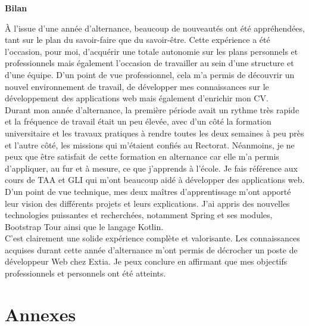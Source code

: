 \documentclass[12pt]{article}
\begin{document}
\begin{center}
\bfseries {Bilan}
\end{center}

À l'issue d'une année d'alternance, beaucoup de nouveautés ont été appréhendées, tant sur le plan du savoir-faire que du savoir-être. Cette expérience a été l'occasion, pour moi, d'acquérir une totale autonomie sur les plans personnels et professionnels mais également l'occasion de travailler au sein d'une structure et d'une équipe. D'un point de vue professionnel, cela m'a permis de découvrir un nouvel environnement de travail, de développer mes connaissances sur le développement des applications web mais également d'enrichir mon CV. \\


Durant mon année d'alternance, la première période avait un rythme très rapide et la fréquence de travail était un peu élevée, avec d'un côté la formation universitaire et les travaux pratiques à rendre toutes les deux semaines à peu près et l'autre côté, les missions qui m'étaient confiés au Rectorat. Néanmoins, je ne peux que être satisfait de cette formation en alternance car elle m'a permis d'appliquer, au fur et à mesure, ce que j’apprends à l'école. Je fais référence aux cours de TAA et GLI qui m'ont beaucoup aidé à développer des applications web. \\

D'un point de vue technique, mes deux maîtres d’apprentissage m'ont apporté leur vision des différents projets et leurs explications. J'ai appris des nouvelles technologies puissantes et recherchées, notamment Spring et ses modules, Bootstrap Tour ainsi que le langage Kotlin. \\

C'est clairement une solide expérience complète et valorisante. Les connaissances acquises durant cette année d'alternance m'ont permis de décrocher un poste de développeur Web chez Extia. Je peux conclure en affirmant que mes objectifs professionnels et personnels ont été atteints. 
	

\newpage
\section{Annexes}
\end{document}
